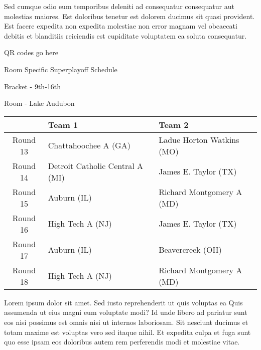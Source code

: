 \documentclass{article}%
\begin{document}
\newline%
Sed cumque odio eum temporibus deleniti ad consequatur consequatur aut molestias maiores. Est doloribus tenetur est dolorem ducimus sit quasi provident. Est facere expedita non expedita molestiae non error magnam vel obcaecati debitis et blanditiis reiciendis est cupiditate voluptatem ea soluta consequatur.%
\vspace*{140pt}%
\begin{center}%
\begin{Huge}%
QR codes go here%
\end{Huge}%
\end{center}%
\newpage%
\begin{center}%
\begin{Huge}%
Room Specific Superplayoff Schedule%
\end{Huge}%
\vspace*{8pt}%
\linebreak%
\begin{Large}%
Bracket {-} 9th{-}16th%
\end{Large}%
\vspace*{8pt}%
\linebreak%
\vspace*{8pt}%
\begin{Large}%
Room {-} Lake Audubon%
\end{Large}%
\end{center}%
%
\begin{tabularx}{\textwidth}{|c|Y|Y|}%
\hline%
&Team 1&Team 2\\%
\hline%
Round 13&Chattahoochee A (GA)&Ladue Horton Watkins (MO)\\%
Round 14&Detroit Catholic Central A (MI)&James E. Taylor (TX)\\%
Round 15&Auburn (IL)&Richard Montgomery A (MD)\\%
Round 16&High Tech A (NJ)&James E. Taylor (TX)\\%
Round 17&Auburn (IL)&Beavercreek (OH)\\%
Round 18&High Tech A (NJ)&Richard Montgomery A (MD)\\%
\hline%
\end{tabularx}%
\vspace*{8pt}%
\newline%
Lorem ipsum dolor sit amet. Sed iusto reprehenderit ut quis voluptas ea Quis assumenda ut eius magni eum voluptate modi? Id unde libero ad pariatur sunt eos nisi possimus est omnis nisi ut internos laboriosam. Sit nesciunt ducimus et totam maxime est voluptas vero sed itaque nihil. Et expedita culpa et fuga sunt quo esse ipsam eos doloribus autem rem perferendis modi et molestiae vitae.\newline%
\end{document}
